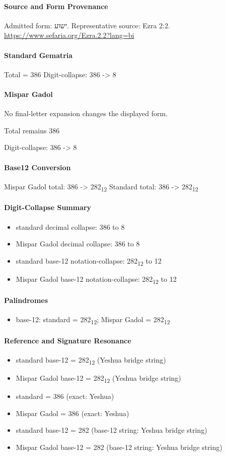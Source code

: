 \paragraph{Source and Form Provenance}
Admitted form: ישוע.
Representative source: Ezra 2:2.
\url{https://www.sefaria.org/Ezra.2.2?lang=bi}
\paragraph{Standard Gematria}
Total = 386
Digit-collapse: 386 -> 8
\paragraph{Mispar Gadol}
No final-letter expansion changes the displayed form.

Total remains 386

Digit-collapse: 386 -> 8
\paragraph{Base12 Conversion}
Mispar Gadol total: 386 -> 282\textsubscript{12}
Standard total: 386 -> 282\textsubscript{12}
\paragraph{Digit-Collapse Summary}
\begin{itemize}
\item standard decimal collapse: 386 to 8
\item Mispar Gadol decimal collapse: 386 to 8
\item standard base-12 notation-collapse: 282\textsubscript{12} to 12
\item Mispar Gadol base-12 notation-collapse: 282\textsubscript{12} to 12
\end{itemize}
\paragraph{Palindromes}
\begin{itemize}
\item base-12: standard = 282\textsubscript{12}; Mispar Gadol = 282\textsubscript{12}
\end{itemize}
\paragraph{Reference and Signature Resonance}
\begin{itemize}
\item standard base-12 = 282\textsubscript{12} (Yeshua bridge string)
\item Mispar Gadol base-12 = 282\textsubscript{12} (Yeshua bridge string)
\item standard = 386 (exact: Yeshua)
\item Mispar Gadol = 386 (exact: Yeshua)
\item standard base-12 = 282 (base-12 string: Yeshua bridge string)
\item Mispar Gadol base-12 = 282 (base-12 string: Yeshua bridge string)
\end{itemize}
